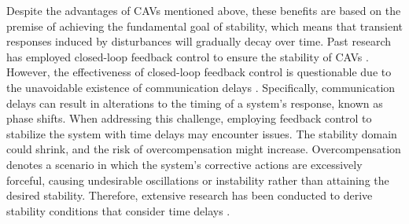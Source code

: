 \documentclass[a4paper]{cas-sc}
\begin{document}
Despite the advantages of CAVs mentioned above, these benefits are based on the premise of achieving the fundamental goal of stability, which means that transient responses induced by disturbances will gradually decay over time. Past research has employed closed-loop feedback control to ensure the stability of CAVs \citep{eyre1998simplified,will1997modelling}. However, the effectiveness of closed-loop feedback control is questionable due to the unavoidable existence of communication delays \citep{abdallah2011stability}. Specifically, communication delays can result in alterations to the timing of a system's response, known as phase shifts. When addressing this challenge, employing feedback control to stabilize the system with time delays may encounter issues. The stability domain could shrink, and the risk of overcompensation might increase. Overcompensation denotes a scenario in which the system's corrective actions are excessively forceful, causing undesirable oscillations or instability rather than attaining the desired stability. Therefore, extensive research has been conducted to derive stability conditions that consider time delays \citep{Wang2018a,hua2022stability,wang2022damping}. 
\end{document}
